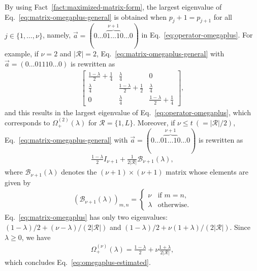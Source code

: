 \documentclass[twocolumn,superscriptaddress,pra,footinbib,notitlepage]{revtex4-1}
\newcommand{\1}{\mbox{1}\hspace{-0.25em}\mbox{l}}
\newcommand{\abs}[1]{\lvert#1\rvert}
\begin{document}
By using Fact~\ref{fact:maximized-matrix-form}, the largest eigenvalue of Eq.~\eqref{eq:matrix-omegaplus-general} is obtained when $p_j+1=p_{j+1}$ for all $j\in\{1,\dots,\nu\}$, namely, $\vec{a}=(0\dots0\overbrace{1\dots1}^{\nu+1}0\dots0)$ in Eq.~\eqref{eq:operator-omegaplus}.
For example, if $\nu=2$ and $\abs{\mathcal{R}}=2$, Eq.~\eqref{eq:matrix-omegaplus-general} with $\vec{a}=(0\dots01110\dots0)$ is rewritten as
\begin{align}
\begin{bmatrix}
\frac{1-\lambda}{2}+\frac{1}{4}&\frac{\lambda}{4}&0\\
\frac{\lambda}{4}&\frac{1-\lambda}{2}+\frac{1}{2}&\frac{\lambda}{4}\\
0&\frac{\lambda}{4}&\frac{1-\lambda}{2}+\frac{1}{4}
\end{bmatrix},
\end{align}
and this results in the largest eigenvalue of Eq.~\eqref{eq:operator-omegaplus}, which corresponds to $\Omega_+^{(2)}(\lambda)$ for $\mathcal{R}=\{1, L\}$.
Moreover, if $\nu\leq t~(=\abs{\mathcal{R}}/2)$, Eq.~\eqref{eq:matrix-omegaplus-general} with $\vec{a}=(0\dots0\overbrace{1\dots1}^{\nu+1}0\dots0)$ is rewritten as
\begin{align}
\frac{1-\lambda}{2}I_{\nu+1}+\frac{1}{2\abs{\mathcal{R}}}\mathcal{B}_{\nu+1}(\lambda),\label{eq:matrix-omegaplus}
\end{align}
where $\mathcal{B}_{\nu+1}(\lambda)$ denotes the $(\nu+1)\times(\nu+1)$ matrix whose elements are given by
\begin{align}
\left(\mathcal{B}_{\nu+1}(\lambda)\right)_{m, n}=
\begin{cases}
\nu&\textrm{if }m=n,\\
\lambda&\textrm{otherwise}.
\end{cases}
\end{align}
Eq.~\eqref{eq:matrix-omegaplus} has only two eigenvalues: $(1-\lambda)/2+(\nu-\lambda)/(2\abs{\mathcal{R}})$ and $(1-\lambda)/2+\nu(1+\lambda)/(2\abs{\mathcal{R}})$. Since $\lambda\geq0$, we have
\begin{align}
\Omega_+^{(\nu)}(\lambda)=\frac{1-\lambda}{2}+\nu\frac{1+\lambda}{2\abs{\mathcal{R}}},
\end{align}
which concludes Eq.~\eqref{eq:omegaplus-estimated}.
\end{document}
